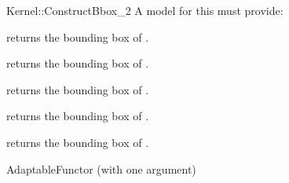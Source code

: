 \begin{ccRefFunctionObjectConcept}{Kernel::ConstructBbox_2}
A model for this must provide:



 {returns the bounding box of .}

 {returns the bounding box of .}

 {returns the bounding box of .}

 {returns the bounding box of .}

 {returns the bounding box of .}


\ccRefines
AdaptableFunctor (with one argument)



\end{ccRefFunctionObjectConcept}
